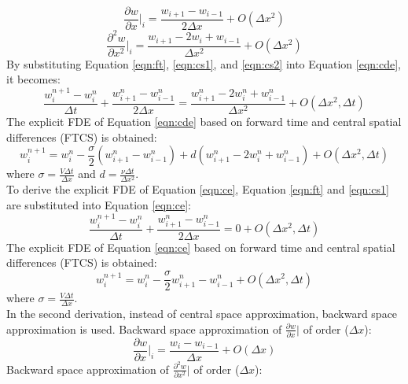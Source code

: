 \documentclass[letterpaper,12pt]{article}
\begin{document}
\begin{equation}
	\frac{\partial w}{\partial x}\vert_{i}=\frac{w_{i+1}-w_{i-1}}{2\Delta x}+O(\Delta x^2)
	\label{eqn:cs1}
\end{equation}
\begin{equation}
	\frac{\partial^2 w}{\partial x^2}\vert_{i}=\frac{w_{i+1}-2w_i+w_{i-1}}{\Delta x^2}+O(\Delta x^2)
	\label{eqn:cs2}
\end{equation}
By substituting Equation \ref{eqn:ft}, \ref{eqn:cs1}, and \ref{eqn:cs2} into Equation \ref{eqn:cde}, it becomes:
\begin{equation}
	\frac{w_{i}^{n+1}-{w_{i}^{n}}}{\Delta t}+\frac{w_{i+1}^{n}-w_{i-1}^{n}}{2\Delta x}
	=\frac{w_{i+1}^{n}-2w_{i}^{n}+w_{i-1}^{n}}{\Delta x^2}+O(\Delta x^2, \Delta t)
\end{equation}
The explicit FDE of Equation \ref{eqn:cde} based on forward time and central spatial differences (FTCS) is obtained:
\begin{equation}
	w_{i}^{n+1}= w_{i}^{n}-\frac{\sigma}{2}(w_{i+1}^{n}-w_{i-1}^{n})+d(w_{i+1}^{n}-2w_{i}^{n}+w_{i-1}^{n})+O(\Delta x^2,\Delta t)
	\label{eqn:FTCS}
\end{equation}
where $\sigma = \frac{V\Delta t}{\Delta x }$ and $d = \frac{\nu\Delta t}{\Delta x^2 }$.
\\To derive the explicit FDE of Equation \ref{eqn:ce}, Equation \ref{eqn:ft} and \ref{eqn:cs1} are
substituted into Equation \ref{eqn:ce}:
\begin{equation}
	\frac{w_{i}^{n+1}-{w_{i}^{n}}}{\Delta t}+\frac{w_{i+1}^{n}-w_{i-1}^{n}}{2\Delta x}
	=0+O(\Delta x^2, \Delta t)
\end{equation}
The explicit FDE of Equation \ref{eqn:ce} based on forward time and central spatial differences (FTCS) is obtained:
\begin{equation}
	w_{i}^{n+1}= w_{i}^{n}-\frac{\sigma}{2}w_{i+1}^{n}-w_{i-1}^{n}+O(\Delta x^2, \Delta t)
\end{equation}
where $\sigma = \frac{V\Delta t}{\Delta x }$.
\\In the second derivation, instead of central space approximation, backward space approximation is used.
Backward space approximation of $\frac{\partial w}{\partial x}\vert$ of order ($\Delta x$):
\begin{equation}
	\frac{\partial w}{\partial x}\vert_{i}=\frac{w_{i}-w_{i-1}}{\Delta x}+O(\Delta x)
	\label{eqn:bs1}
\end{equation}
Backward space approximation of $\frac{\partial^2 w}{\partial x^2}\vert$ of order ($\Delta x$):
\end{document}
